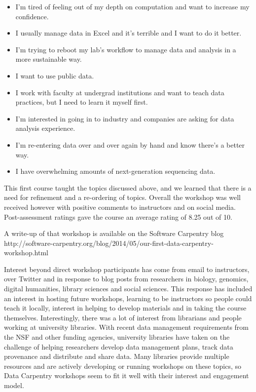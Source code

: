 \documentclass[11pt]{article}
\begin{document}
\begin{itemize}
\item I'm tired of feeling out of my depth on computation and want to increase my confidence.
\item I usually manage data in Excel and it's terrible and I want to do it better.
\item I'm trying to reboot my lab's workflow to manage data and analysis in a more sustainable way.
\item I want to use public data.
\item I work with faculty at undergrad institutions and want to teach data practices, but I need to learn it myself first.
\item I'm interested in going in to industry and companies are asking for data analysis experience.
\item I'm re-entering data over and over again by hand and know there's a better way.
\item I have overwhelming amounts of next-generation sequencing data.
\end{itemize}

This first course taught the topics discussed above, and we learned that there is a need for refinement and a 
re-ordering of topics. Overall the workshop was well received however with positive comments to instructors and on social media. Post-assessment ratings gave the course an average rating of 8.25 out of 10.

A write-up of that workshop is available on the Software Carpentry blog
\\http://software-carpentry.org/blog/2014/05/our-first-data-carpentry-workshop.html

Interest beyond direct workshop participants has come from email to instructors, over Twitter and in response to blog posts from researchers in biology, genomics, digital humanities, library sciences and social sciences.
This response has 
included an interest in hosting future workshops, learning to be 
instructors so people could teach it locally, interest in helping to develop materials and in taking the course themselves.
Interestingly, there was a lot of interest from librarians and people working at university libraries. With recent data management requirements from the NSF and other funding agencies, university libraries have
taken on the challenge of helping researchers develop data management plans, track data provenance and 
distribute and share data. Many libraries provide multiple resources and are actively developing or running workshops
on these topics, so Data Carpentry workshops seem to fit it well with their interest and engagement model.
\end{document}
